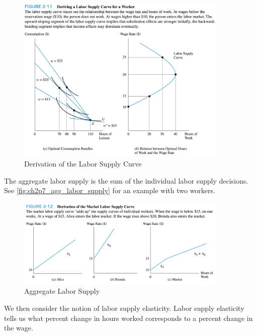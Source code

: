 \FloatBarrier

\begin{figure}[!htb]
    \centering
        \includegraphics[width=0.9\textwidth]{../input/ch_2p7_derive_labor_supply.png}
    \caption{Derivation of the Labor Supply Curve}
    \label{fig:ch2p7_derive_labor_supply}
\end{figure}

\FloatBarrier

The aggregate labor supply is the sum of the 
individual labor supply decisions. 
See \autoref{fig:ch2p7_agg_labor_supply} for an example
with two workers.

\FloatBarrier

\begin{figure}[!htb]
    \centering
        \includegraphics[width=0.9\textwidth]{../input/ch_2p7_agg_labor_supply.png}
    \caption{Aggregate Labor Supply}
    \label{fig:ch2p7_agg_labor_supply}
\end{figure}

\FloatBarrier

We then consider the notion of labor supply elasticity.
Labor supply elasticity tells us what percent change in 
hours worked corresponds to a percent change in the wage.

